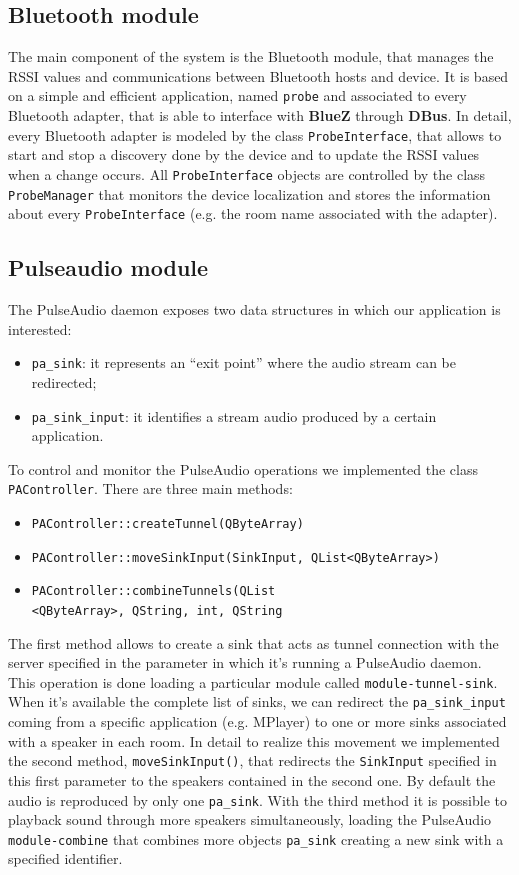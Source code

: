 \documentclass[conference]{IEEEtran}
\begin{document}
\subsection{Bluetooth module}
The main component of the system is the Bluetooth module, that manages the RSSI values and communications between Bluetooth hosts and device. It is based on a simple and efficient application, named \texttt{probe} and associated to every Bluetooth adapter, that is able to interface with \textbf{BlueZ} through \textbf{DBus}. In detail, every Bluetooth adapter is modeled by the class \texttt{ProbeInterface}, that allows to start and stop a discovery done by the device and to update the RSSI values when a change occurs. All \texttt{ProbeInterface} objects are controlled by the class \texttt{ProbeManager} that monitors the device localization and stores the information about every \texttt{ProbeInterface} (e.g. the room name associated with the adapter).

\subsection{Pulseaudio module}
The PulseAudio daemon exposes two data structures in which our application is interested:
\begin{itemize}
\item \texttt{pa\_sink}: it represents an ``exit point'' where the audio stream can be redirected;
\item \texttt{pa\_sink\_input}: it identifies a stream audio produced by a certain application.
\end{itemize}

To control and monitor the PulseAudio operations we implemented the class \texttt{PAController}. There are three main methods:
\begin{itemize}
\item \texttt{PAController::createTunnel(QByteArray)}
\item \texttt{PAController::moveSinkInput(SinkInput, QList<QByteArray>)}
\item \texttt{PAController::combineTunnels(QList \\
<QByteArray>, QString, int, QString}
\end{itemize}
The first method allows to create a sink that acts as tunnel connection with the server specified in the parameter in which it's running a PulseAudio daemon. This operation is done loading a particular module called \texttt{module-tunnel-sink}. When it's available the complete list of sinks, we can redirect the \texttt{pa\_sink\_input} coming from a specific application (e.g. MPlayer) to one or more sinks associated with a speaker in each room. In detail to realize this movement we implemented the second method, \texttt{moveSinkInput()}, that redirects the \texttt{SinkInput} specified in this first parameter to the speakers contained in the second one.
By default the audio is reproduced by only one \texttt{pa\_sink}. With the third method it is possible to playback sound through more speakers simultaneously, loading the PulseAudio \texttt{module-combine} that combines more objects \texttt{pa\_sink} creating a new sink with a specified identifier.
\end{document}
